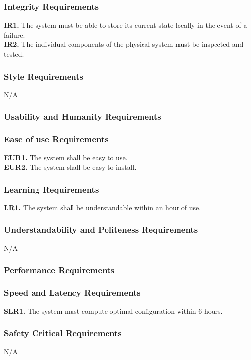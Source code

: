 \documentclass[12pt, titlepage]{article}
\begin{document}
\subsubsection{Integrity Requirements}
\color{red}
\textbf{IR1.} The system must be able to store its current state locally in the event of a failure.\\
\textbf{IR2.} The individual components of the physical system must be inspected and tested.
\color{black}
\subsubsection{Style Requirements}
N/A
\subsubsection{Usability and Humanity Requirements}
\subsubsection{Ease of use Requirements}
\textbf{EUR1.} The system shall be easy to use.\\
\textbf{EUR2.} The system shall be easy to install.

\subsubsection{Learning Requirements}
\textbf{LR1.} The system shall be understandable within an hour of use.

\subsubsection{Understandability and Politeness Requirements}
N/A

\subsubsection{Performance Requirements}
\subsubsection{Speed and Latency Requirements}
\textbf{SLR1.} The system must compute optimal configuration within 6 hours.

\subsubsection{Safety Critical Requirements}
N/A
\end{document}
